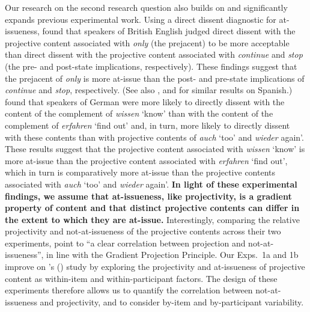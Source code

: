 \documentclass[11pt,fleqn]{article}
\newcommand{\6}{\mbox{$[\hspace*{-.6mm}[$}}
\newcommand{\9}{\mbox{$]\hspace*{-.6mm}]$}}
\newcommand{\citetpos}[1]{\citeauthor{#1}'s (\citeyear{#1})}
\begin{document}
Our research on the second research question also builds on and significantly expands previous experimental work. 
 Using a direct dissent diagnostic for at-issueness, \citet{amaral-etal11} found that speakers of British English judged direct dissent with the projective content associated with {\em only} (the prejacent) to be more acceptable than direct dissent with the projective content associated with {\em continue} and {\em stop} (the pre- and post-state implications, respectively). These findings suggest that the prejacent of {\em only} is more at-issue than the post- and pre-state implications of {\em continue} and {\em stop}, respectively. (See also \citealt{cummins-etal2012}, and \citealt{amaral-cummins2015} for similar results on Spanish.) \citet{xue-onea11} found that speakers of German were more likely to directly dissent with the content of the complement of {\em wissen} `know' than with the content of the complement of {\em erfahren} `find out' and, in turn, more likely to directly dissent with these contents than with projective contents of {\em auch} `too' and {\em wieder} again'. These results suggest that the projective content associated with {\em wissen} `know' is more at-issue than the projective content associated with {\em erfahren} `find out', which in turn is comparatively more at-issue than the projective contents associated with {\em auch} `too' and {\em wieder} again'. {\bf In light of these experimental findings, we assume that at-issueness, like projectivity, is a gradient property of content and that distinct projective contents can differ in the extent to which they are at-issue.} Interestingly, comparing the relative projectivity and not-at-issueness 
of the projective contents across their two experiments, \citet[180]{xue-onea11} point to ``a clear correlation between projection and not-at-issueness'', in line with the Gradient Projection Principle. Our Exps.~1a and 1b improve on \citetpos{xue-onea11} study by exploring the projectivity and at-issueness of projective content as within-item and within-participant factors. The design of these experiments therefore allows us to quantify the correlation between not-at-issueness and projectivity, and to consider by-item and by-participant variability. 
\end{document}
